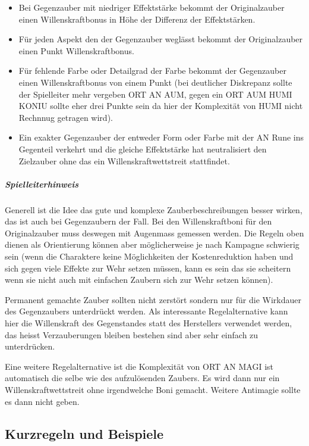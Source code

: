 \documentclass{article}
\begin{document}
\begin{itemize}
\item Bei Gegenzauber mit niedriger Effektstärke bekommt der Originalzauber einen Willenskraftbonus in Höhe der Differenz der Effektstärken.
\item Für jeden Aspekt den der Gegenzauber weglässt bekommt der Originalzauber einen Punkt Willenskraftbonus.
\item Für fehlende Farbe oder Detailgrad der Farbe bekommt der Gegenzauber einen Willenskraftbonus von einem Punkt (bei deutlicher Diskrepanz sollte der Spielleiter mehr vergeben ORT AN AUM, gegen ein ORT AUM HUMI KONIU sollte eher drei Punkte sein da hier der Komplexität von HUMI nicht Rechnnug getragen wird).
\item Ein exakter Gegenzauber der entweder Form oder Farbe mit der AN Rune ins Gegenteil verkehrt und die gleiche Effektstärke hat neutralisiert den Zielzauber ohne das ein Willenskraftwettstreit stattfindet.
\end{itemize}

\begin{mdframed}[hidealllines=true, backgroundcolor=black!10]
\subparagraph{Spielleiterhinweis}

Generell ist die Idee das gute und komplexe Zauberbeschreibungen besser wirken, das ist auch bei Gegenzaubern der
Fall. Bei den Willenskraftboni für den Originalzauber muss deswegen mit Augenmass gemessen werden. Die Regeln oben
dienen als Orientierung können aber möglicherweise je nach Kampagne schwierig sein (wenn die Charaktere keine
Möglichkeiten der Kostenreduktion haben und sich gegen viele Effekte zur Wehr setzen müssen, kann es sein das sie
scheitern wenn sie nicht auch mit einfachen Zaubern sich zur Wehr setzen können).

Permanent gemachte Zauber sollten nicht zerstört sondern nur für die Wirkdauer des Gegenzaubers unterdrückt werden.
Als interessante Regelalternative kann hier die Willenskraft des Gegenstandes statt des Herstellers verwendet werden,
das heisst Verzauberungen bleiben bestehen sind aber sehr einfach zu unterdrücken.

Eine weitere Regelalternative ist die Komplexität von ORT AN MAGI ist automatisch die selbe wie des aufzulösenden
Zaubers. Es wird dann nur ein Willenskraftwettstreit ohne irgendwelche Boni gemacht. Weitere Antimagie sollte es dann
nicht geben.

\end{mdframed}
\begin{center}
\subsection{Kurzregeln und Beispiele}
\end{center}
\end{document}

